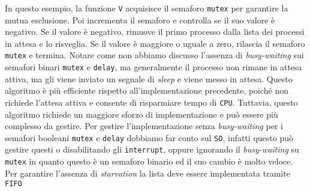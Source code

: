        In questo esempio, la funzione \texttt{V} acquisisce il semaforo \texttt{mutex} per garantire la mutua esclusione. Poi incrementa il semaforo e controlla se il suo valore è negativo. Se il valore è negativo, rimuove il primo processo dalla lista dei processi in attesa e lo risveglia. Se il valore è maggiore o uguale a zero, rilascia il semaforo \texttt{mutex} e termina. Notare come non abbiamo discusso l'assenza di \textit{busy-waiting} sui semafori binari \texttt{mutex} e \texttt{delay}, ma generalmente il processo non rimane in attesa attiva, ma gli viene inviato un segnale di \textit{sleep} e viene messo in attesa. Questo algoritmo è più efficiente rispetto all'implementazione precedente, poiché non richiede l'attesa attiva e consente di risparmiare tempo di \texttt{CPU}. Tuttavia, questo algoritmo richiede un maggiore sforzo di implementazione e può essere più complesso da gestire.\newline
        Per gestire l'implementazione senza \textit{busy-waiting} per i semafori booleani \texttt{mutex} e \texttt{delay} dobbiamo far conto sul \texttt{SO}, infatti questo può gestire questi o disabilitando gli \texttt{interrupt}, oppure ignorando il \textit{busy-waiting} su \texttt{mutex} in quanto questo è un semaforo binario ed il suo cambio è molto veloce.\newline
        Per garantire l'assenza di \textit{starvation} la lista deve essere implementata tramite \texttt{FIFO}
